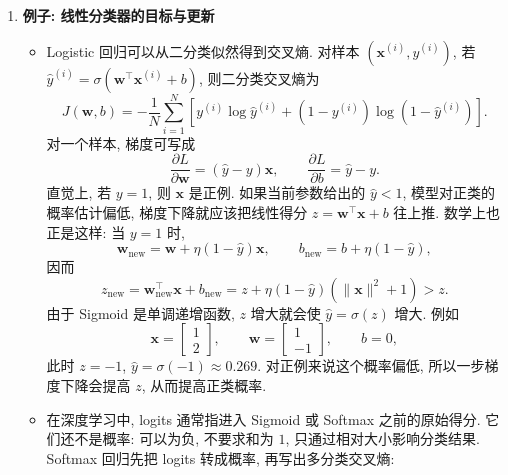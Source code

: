 \documentclass{../nndlcourse}
\begin{document}
\begin{enumerate}
    \item \textbf{例子: 线性分类器的目标与更新}
    \begin{itemize}
        \item Logistic 回归可以从二分类似然得到交叉熵. 对样本 $(\boldsymbol{x}^{(i)},y^{(i)})$, 若 $\hat{y}^{(i)}=\sigma(\boldsymbol{w}^{\top}\boldsymbol{x}^{(i)}+b)$, 则二分类交叉熵为
        \[
            J(\boldsymbol{w},b)
            =
            -\frac{1}{N}\sum_{i=1}^{N}
            \left[
                y^{(i)}\log \hat{y}^{(i)}
                +
                \left(1-y^{(i)}\right)\log\left(1-\hat{y}^{(i)}\right)
            \right].
        \]
        对一个样本, 梯度可写成
        \[
            \frac{\partial L}{\partial \boldsymbol{w}}
            =
            (\hat{y}-y)\boldsymbol{x},
            \qquad
            \frac{\partial L}{\partial b}
            =
            \hat{y}-y.
        \]
        直觉上, 若 $y=1$, 则 $\boldsymbol{x}$ 是正例. 如果当前参数给出的 $\hat{y}<1$, 模型对正类的概率估计偏低, 梯度下降就应该把线性得分 $z=\boldsymbol{w}^{\top}\boldsymbol{x}+b$ 往上推. 数学上也正是这样: 当 $y=1$ 时,
        \[
            \boldsymbol{w}_{\mathrm{new}}
            =
            \boldsymbol{w}
            +
            \eta(1-\hat{y})\boldsymbol{x},
            \qquad
            b_{\mathrm{new}}
            =
            b+\eta(1-\hat{y}),
        \]
        因而
        \[
            z_{\mathrm{new}}
            =
            \boldsymbol{w}_{\mathrm{new}}^{\top}\boldsymbol{x}
            +
            b_{\mathrm{new}}
            =
            z+\eta(1-\hat{y})(\|\boldsymbol{x}\|^2+1)
            >
            z.
        \]
        由于 Sigmoid 是单调递增函数, $z$ 增大就会使 $\hat{y}=\sigma(z)$ 增大. 例如
        \[
            \boldsymbol{x}
            =
            \begin{bmatrix}
            1\\
            2
            \end{bmatrix},
            \qquad
            \boldsymbol{w}
            =
            \begin{bmatrix}
            1\\
            -1
            \end{bmatrix},
            \qquad
            b=0,
        \]
        此时 $z=-1$, $\hat{y}=\sigma(-1)\approx0.269$. 对正例来说这个概率偏低, 所以一步梯度下降会提高 $z$, 从而提高正类概率.
        \item 在深度学习中, logits 通常指进入 Sigmoid 或 Softmax 之前的原始得分. 它们还不是概率: 可以为负, 不要求和为 $1$, 只通过相对大小影响分类结果. Softmax 回归先把 logits 转成概率, 再写出多分类交叉熵:

\end{itemize}
\end{enumerate}
\end{document}
